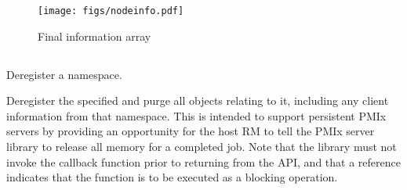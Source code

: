 \begingroup
\begin{figure*}[ht!]
  \begin{center}
    \texttt{[image: figs/nodeinfo.pdf]}
  \end{center}
  \caption{Final information array}
  \label{fig:nodeinfo}
\end{figure*}
\endgroup


\subsection{}

\summary

Deregister a namespace.

\format


\begin{arglist}
\end{arglist}

\descr

Deregister the specified  and purge all objects relating to it, including any client information from that namespace.
This is intended to support persistent \ac{PMIx} servers by providing an opportunity for the host \ac{RM} to tell the \ac{PMIx} server library to release all memory for a completed job. Note that the library must not invoke the callback function prior to returning from the \ac{API}, and that a   reference indicates that the function is to be executed as a blocking operation.


\subsection{}

